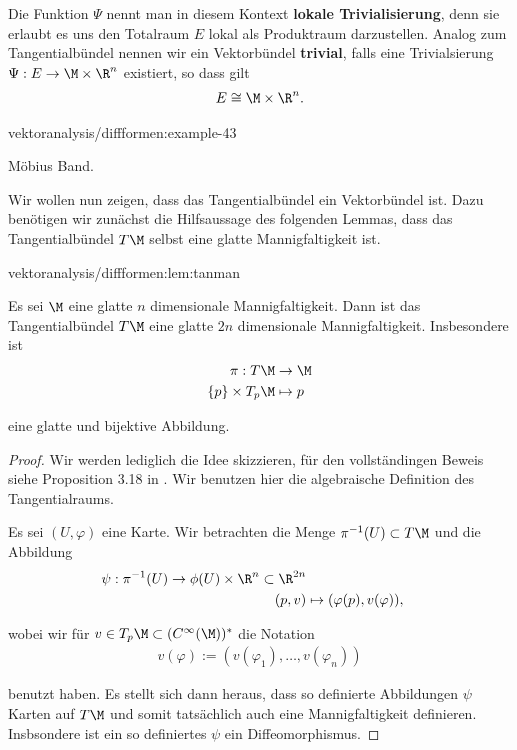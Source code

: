 \documentclass[letterpaper,10pt,english]{jupyterBook}
\begin{document}
\par
Die Funktion \(\Psi\) nennt man in diesem Kontext \textbf{lokale Trivialisierung}, denn sie erlaubt es uns den Totalraum \(E\) lokal als Produktraum darzustellen.
Analog zum Tangentialbündel nennen wir ein Vektorbündel \textbf{trivial}, falls eine Trivialsierung \(\Psi:E\to \M\times\R^n\) existiert, so dass gilt
\begin{align*}
E \cong \M\times\R^n.
\end{align*}\begin{example}{}{vektoranalysis/diffformen:example-43}



\par
Möbius Band.
\end{example}

\par
Wir wollen nun zeigen, dass das Tangentialbündel ein Vektorbündel ist.
Dazu benötigen wir zunächst die Hilfsaussage des folgenden Lemmas, dass das Tangentialbündel \(T\M\) selbst eine glatte Mannigfaltigkeit ist.
\begin{lemma}{}{vektoranalysis/diffformen:lem:tanman}



\par
Es sei \(\M\) eine glatte \(n\) dimensionale Mannigfaltigkeit.
Dann ist das Tangentialbündel \(T\M\) eine glatte \(2n\) dimensionale Mannigfaltigkeit.
Insbesondere ist
\begin{align*}
\pi:T\M &\to \M\\
\{p\}\times T_p\M &\mapsto p
\end{align*}
\par
eine glatte und bijektive Abbildung.
\end{lemma}

\begin{proof}
 Wir werden lediglich die Idee skizzieren, für den vollständingen Beweis siehe Proposition 3.18 in \cite{Lee03}.
Wir benutzen hier die algebraische Definition des Tangentialraums.

\par
Es sei \((U,\varphi)\) eine Karte.
Wir betrachten die Menge \(\pi^{-1}(U)\subset T\M\) und die Abbildung
\begin{align*}
\psi:\pi^{-1}(U) \to \phi(U)\times \R^{n}\subset\R^{2n}\\
(p,v) &\mapsto (\varphi(p), v(\varphi)),
\end{align*}
\par
wobei wir für \(v\in T_p\M\subset (C^\infty(\M))^\ast\) die Notation
\begin{align*}
v(\varphi) := (v(\varphi_1),\ldots, v(\varphi_n))
\end{align*}
\par
benutzt haben.
Es stellt sich dann heraus, dass so definierte Abbildungen \(\psi\) Karten auf \(T\M\) und somit tatsächlich auch eine Mannigfaltigkeit definieren.
Insbsondere ist ein so definiertes \(\psi\) ein Diffeomorphismus.
\end{proof}
\end{document}
